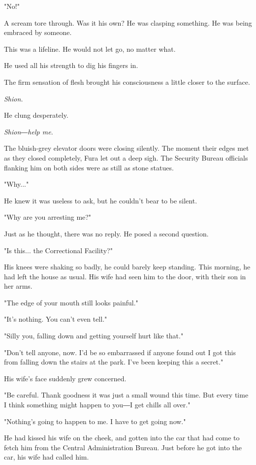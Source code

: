 "No!"

A scream tore through. Was it his own? He was clasping something. He was
being embraced by someone.

This was a lifeline. He would not let go, no matter what.

He used all his strength to dig his fingers in.

The firm sensation of flesh brought his consciousness a little closer to
the surface.

\emph{Shion.}

He clung desperately.

\emph{Shion―help me.}

\mybreak

The bluish-grey elevator doors were closing silently. The moment their
edges met as they closed completely, Fura let out a deep sigh. The
Security Bureau officials flanking him on both sides were as still as
stone statues.

"Why..."

He knew it was useless to ask, but he couldn't bear to be silent.

"Why are you arresting me?"

Just as he thought, there was no reply. He posed a second question.

"Is this... the Correctional Facility?"

His knees were shaking so badly, he could barely keep standing. This
morning, he had left the house as usual. His wife had seen him to the
door, with their son in her arms.

"The edge of your mouth still looks painful."

"It's nothing. You can't even tell."

"Silly you, falling down and getting yourself hurt like that."

"Don't tell anyone, now. I'd be so embarrassed if anyone found out I got
this from falling down the stairs at the park. I've been keeping this a
secret."

His wife's face suddenly grew concerned.

"Be careful. Thank goodness it was just a small wound this time. But
every time I think something might happen to you―I get chills all over."

"Nothing's going to happen to me. I have to get going now."

He had kissed his wife on the cheek, and gotten into the car that had
come to fetch him from the Central Administration Bureau. Just before he
got into the car, his wife had called him.

